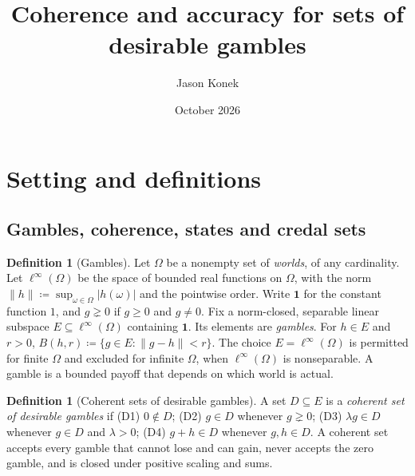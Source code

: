 \documentclass[11pt]{article}
\title{Coherence and accuracy for sets of desirable gambles}
\author{Jason Konek}
\date{October 2026}
\theoremstyle{definition}
\newtheorem{definition}[theorem]{Definition}
\newcommand{\one}{\mathbf 1}
\begin{document}
\maketitle

\section{Setting and definitions}\label{sec:setting}

\subsection{Gambles, coherence, states and credal sets}

\begin{definition}[Gambles]\label{def:gambles}
Let $\Omega$ be a nonempty set of \emph{worlds}, of any cardinality. Let $\ell^\infty(\Omega)$ be the space of bounded real functions on $\Omega$, with the norm $\|h\|\coloneqq\sup_{\omega\in\Omega}|h(\omega)|$ and the pointwise order. Write $\one$ for the constant function $1$, and $g\gneq0$ if $g\ge0$ and $g\ne0$. Fix a norm-closed, separable linear subspace $E\subseteq\ell^\infty(\Omega)$ containing $\one$. Its elements are \emph{gambles}. For $h\in E$ and $r>0$, $B(h,r)\coloneqq\{g\in E:\|g-h\|<r\}$. The choice $E=\ell^\infty(\Omega)$ is permitted for finite $\Omega$ and excluded for infinite $\Omega$, when $\ell^\infty(\Omega)$ is nonseparable. {\color{red}A gamble is a bounded payoff that depends on which world is actual.}
\end{definition}

\begin{definition}[Coherent sets of desirable gambles]\label{def:coherence}
A set $D\subseteq E$ is a \emph{coherent set of desirable gambles} if
(D1) $0\notin D$;
(D2) $g\in D$ whenever $g\gneq0$;
(D3) $\lambda g\in D$ whenever $g\in D$ and $\lambda>0$;
(D4) $g+h\in D$ whenever $g,h\in D$.
{\color{red}A coherent set accepts every gamble that cannot lose and can gain, never accepts the zero gamble, and is closed under positive scaling and sums.}
\end{definition}
\end{document}
